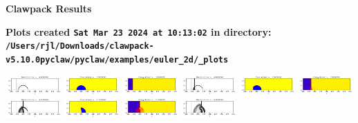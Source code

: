 \documentclass[11pt]{article}
\begin{document}
        \begin{center}{\Large\bf Clawpack Results}\vskip 5pt
        
        \bf Plots created {\tt Sat Mar 23 2024 at 10:13:02} in directory: \vskip 5pt
        \verb+/Users/rjl/Downloads/clawpack-v5.10.0pyclaw/pyclaw/examples/euler_2d/_plots+
        \end{center}
        \vskip 5pt
        \includegraphics[width=0.15833333333333333\textwidth]{frame0000fig0.png}
\includegraphics[width=0.15833333333333333\textwidth]{frame0000fig1.png}
\includegraphics[width=0.15833333333333333\textwidth]{frame0000fig2.png}
\includegraphics[width=0.15833333333333333\textwidth]{frame0001fig0.png}
\includegraphics[width=0.15833333333333333\textwidth]{frame0001fig1.png}
\includegraphics[width=0.15833333333333333\textwidth]{frame0001fig2.png}
\vskip 10pt 
\includegraphics[width=0.15833333333333333\textwidth]{frame0002fig0.png}
\includegraphics[width=0.15833333333333333\textwidth]{frame0002fig1.png}
\includegraphics[width=0.15833333333333333\textwidth]{frame0002fig2.png}
\includegraphics[width=0.15833333333333333\textwidth]{frame0003fig0.png}
\end{document}
